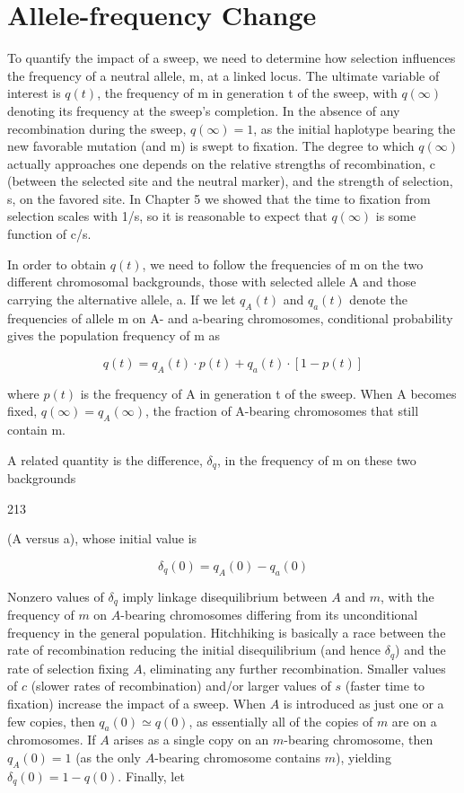 \documentclass{article}
\begin{document}
\section{Allele-frequency Change}
To quantify the impact of a sweep, we need to determine how selection influences the frequency of a neutral allele, m, at a linked locus. The ultimate variable of interest is  $ q(t) $, the frequency of m in generation t of the sweep, with  $ q(\infty) $ denoting its frequency at the sweep's completion. In the absence of any recombination during the sweep,  $ q(\infty) = 1 $, as the initial haplotype bearing the new favorable mutation (and m) is swept to fixation. The degree to which  $ q(\infty) $ actually approaches one depends on the relative strengths of recombination, c (between the selected site and the neutral marker), and the strength of selection, s, on the favored site. In Chapter 5 we showed that the time to fixation from selection scales with 1/s, so it is reasonable to expect that  $ q(\infty) $ is some function of c/s.

In order to obtain  $ q(t) $, we need to follow the frequencies of m on the two different chromosomal backgrounds, those with selected allele A and those carrying the alternative allele, a. If we let  $ q_A(t) $ and  $ q_a(t) $ denote the frequencies of allele m on A- and a-bearing chromosomes, conditional probability gives the population frequency of m as

\begin{equation}
q(t)=q_{A}(t)\cdot p(t)+q_{a}(t)\cdot\left[1-p(t)\right]
\tag{8.1a}
\label{eq:8_1a}
\end{equation}

where  $ p(t) $ is the frequency of A in generation t of the sweep. When A becomes fixed,  $ q(\infty) = q_{A}(\infty) $, the fraction of A-bearing chromosomes that still contain m.

A related quantity is the difference,  $ \delta_{q} $, in the frequency of m on these two backgrounds

213

(A versus a), whose initial value is

\begin{equation}
\delta_{q}(0)=q_{A}(0)-q_{a}(0)
\tag{8.1b}
\label{eq:8_1b}
\end{equation}

Nonzero values of  $ \delta_q $ imply linkage disequilibrium between  $ A $ and  $ m $, with the frequency of  $ m $ on  $ A $-bearing chromosomes differing from its unconditional frequency in the general population. Hitchhiking is basically a race between the rate of recombination reducing the initial disequilibrium (and hence  $ \delta_q $) and the rate of selection fixing  $ A $, eliminating any further recombination. Smaller values of  $ c $ (slower rates of recombination) and/or larger values of  $ s $ (faster time to fixation) increase the impact of a sweep. When  $ A $ is introduced as just one or a few copies, then  $ q_a(0) \simeq q(0) $, as essentially all of the copies of  $ m $ are on a chromosomes. If  $ A $ arises as a single copy on an  $ m $-bearing chromosome, then  $ q_A(0) = 1 $ (as the only  $ A $-bearing chromosome contains  $ m $), yielding  $ \delta_q(0) = 1 - q(0) $. Finally, let
\end{document}
